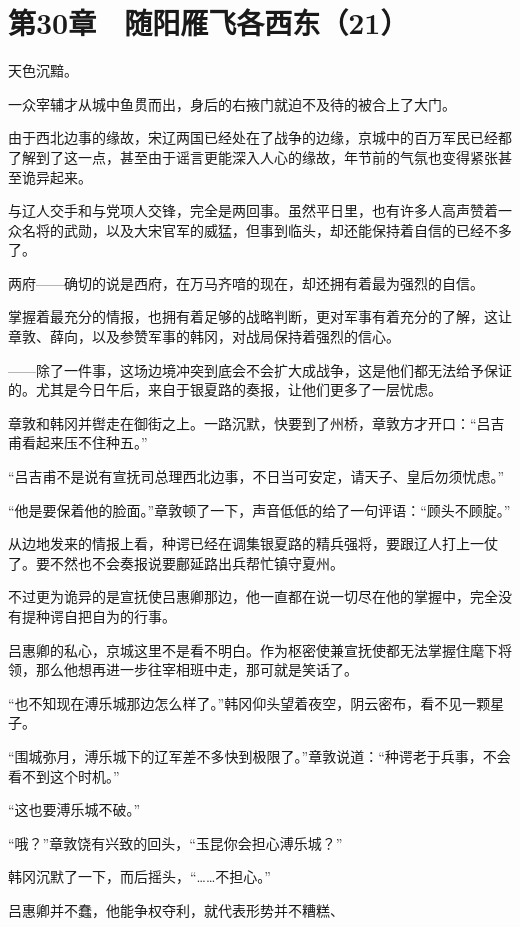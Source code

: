 \section{第30章　随阳雁飞各西东（21）}

天色沉黯。

一众宰辅才从城中鱼贯而出，身后的右掖门就迫不及待的被合上了大门。

由于西北边事的缘故，宋辽两国已经处在了战争的边缘，京城中的百万军民已经都了解到了这一点，甚至由于谣言更能深入人心的缘故，年节前的气氛也变得紧张甚至诡异起来。

与辽人交手和与党项人交锋，完全是两回事。虽然平日里，也有许多人高声赞着一众名将的武勋，以及大宋官军的威猛，但事到临头，却还能保持着自信的已经不多了。

两府——确切的说是西府，在万马齐喑的现在，却还拥有着最为强烈的自信。

掌握着最充分的情报，也拥有着足够的战略判断，更对军事有着充分的了解，这让章敦、薛向，以及参赞军事的韩冈，对战局保持着强烈的信心。

——除了一件事，这场边境冲突到底会不会扩大成战争，这是他们都无法给予保证的。尤其是今日午后，来自于银夏路的奏报，让他们更多了一层忧虑。

章敦和韩冈并辔走在御街之上。一路沉默，快要到了州桥，章敦方才开口：“吕吉甫看起来压不住种五。”

“吕吉甫不是说有宣抚司总理西北边事，不日当可安定，请天子、皇后勿须忧虑。”

“他是要保着他的脸面。”章敦顿了一下，声音低低的给了一句评语：“顾头不顾腚。”

从边地发来的情报上看，种谔已经在调集银夏路的精兵强将，要跟辽人打上一仗了。要不然也不会奏报说要鄜延路出兵帮忙镇守夏州。

不过更为诡异的是宣抚使吕惠卿那边，他一直都在说一切尽在他的掌握中，完全没有提种谔自把自为的行事。

吕惠卿的私心，京城这里不是看不明白。作为枢密使兼宣抚使都无法掌握住麾下将领，那么他想再进一步往宰相班中走，那可就是笑话了。

“也不知现在溥乐城那边怎么样了。”韩冈仰头望着夜空，阴云密布，看不见一颗星子。

“围城弥月，溥乐城下的辽军差不多快到极限了。”章敦说道：“种谔老于兵事，不会看不到这个时机。”

“这也要溥乐城不破。”

“哦？”章敦饶有兴致的回头，“玉昆你会担心溥乐城？”

韩冈沉默了一下，而后摇头，“……不担心。”

吕惠卿并不蠢，他能争权夺利，就代表形势并不糟糕、

